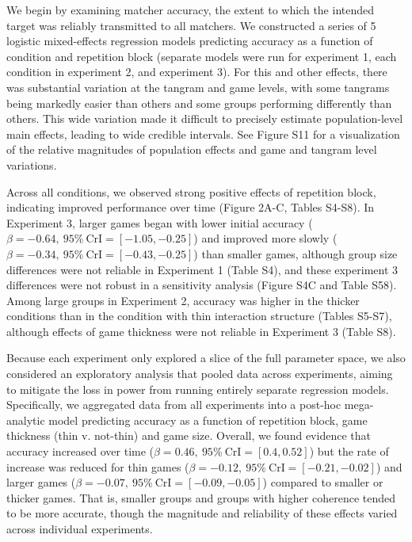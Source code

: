 \documentclass[9pt,twocolumn,twoside]{pnas-new}
\begin{document}
We begin by examining matcher accuracy, the extent to which the intended
target was reliably transmitted to all matchers. We constructed a series
of 5 logistic mixed-effects regression models predicting accuracy as a
function of condition and repetition block (separate models were run for
experiment 1, each condition in experiment 2, and experiment 3). For
this and other effects, there was substantial variation at the tangram
and game levels, with some tangrams being markedly easier than others
and some groups performing differently than others. This wide variation
made it difficult to precisely estimate population-level main effects,
leading to wide credible intervals. See Figure S11 for a visualization
of the relative magnitudes of population effects and game and tangram
level variations.

Across all conditions, we observed strong positive effects of repetition
block, indicating improved performance over time (Figure
2A-C, Tables S4-S8). In Experiment 3, larger games
began with lower initial accuracy
(\(\beta=-0.64,\:95\%\:\mathrm{CrI}=[-1.05, -0.25]\)) and improved more
slowly (\(\beta=-0.34,\:95\%\:\mathrm{CrI}=[-0.43, -0.25]\)) than
smaller games, although group size differences were not reliable in
Experiment 1 (Table S4), and these experiment 3 differences were not
robust in a sensitivity analysis (Figure S4C and Table S58). Among
large groups in Experiment 2, accuracy was higher in the thicker
conditions than in the condition with thin interaction structure (Tables S5-S7), although effects of game thickness were not reliable in
Experiment 3 (Table S8).

Because each experiment only explored a slice of the full parameter
space, we also considered an exploratory analysis that pooled data
across experiments, aiming to mitigate the loss in power from running
entirely separate regression models. Specifically, we aggregated data
from all experiments into a post-hoc mega-analytic model predicting
accuracy as a function of repetition block, game thickness (thin v.
not-thin) and game size. Overall, we found evidence that accuracy
increased over time (\(\beta=0.46,\:95\%\:\mathrm{CrI}=[0.4, 0.52]\))
but the rate of increase was reduced for thin games
(\(\beta=-0.12,\:95\%\:\mathrm{CrI}=[-0.21, -0.02]\)) and larger games
(\(\beta=-0.07,\:95\%\:\mathrm{CrI}=[-0.09, -0.05]\)) compared to
smaller or thicker games. That is, smaller groups and groups with higher
coherence tended to be more accurate, though the magnitude and
reliability of these effects varied across individual experiments.
\end{document}
